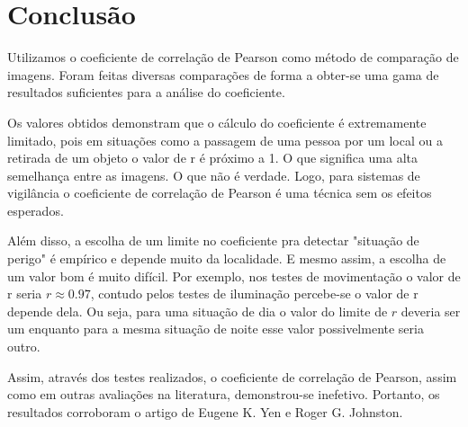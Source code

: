 \documentclass[10pt,a4paper]{article}
\begin{document}
\newpage

\section{Conclusão}
Utilizamos o coeficiente de correlação de Pearson  
como método de comparação de imagens. Foram feitas diversas
comparações de forma a obter-se uma gama de resultados suficientes
para a análise do coeficiente.

Os valores obtidos demonstram que o cálculo do coeficiente é
extremamente limitado, pois em situações como a passagem de uma pessoa
por um local ou a retirada de um objeto o valor de r é próximo a 1. O
que significa uma alta semelhança entre as imagens. O que não é
verdade. Logo, para sistemas de vigilância o coeficiente de correlação
de Pearson é uma técnica sem os efeitos esperados.

Além disso, a escolha de um limite no coeficiente pra detectar "situação de
perigo" é empírico e depende muito da localidade. E mesmo assim, a
escolha de um valor bom é muito difícil. Por exemplo, nos testes de
movimentação o valor de r seria $r \approx0.97$, contudo pelos testes
de iluminação percebe-se o valor de r depende dela. Ou seja, para uma
situação de dia o valor do limite de $r$ deveria ser um enquanto para
a mesma situação de noite esse valor possivelmente seria outro.
 
Assim, através dos testes realizados, o coeficiente de correlação de Pearson, assim como em outras
avaliações na literatura, demonstrou-se inefetivo. Portanto, os
resultados corroboram o artigo de Eugene K. Yen e
Roger G. Johnston.





\begin{small}
  
\end{small}
\end{document}
